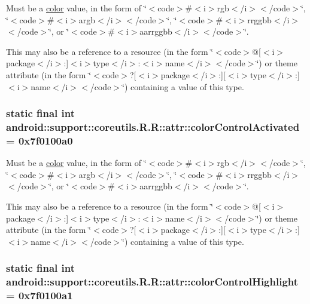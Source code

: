 Must be a \hyperlink{classandroid_1_1support_1_1coreutils_1_1_r_1_1color}{color} value, in the form of \char`\"{}$<$code$>$\#$<$i$>$rgb$<$/i$>$$<$/code$>$\char`\"{}, \char`\"{}$<$code$>$\#$<$i$>$argb$<$/i$>$$<$/code$>$\char`\"{}, \char`\"{}$<$code$>$\#$<$i$>$rrggbb$<$/i$>$$<$/code$>$\char`\"{}, or \char`\"{}$<$code$>$\#$<$i$>$aarrggbb$<$/i$>$$<$/code$>$\char`\"{}. 

This may also be a reference to a resource (in the form \char`\"{}$<$code$>$@\mbox{[}$<$i$>$package$<$/i$>$:\mbox{]}$<$i$>$type$<$/i$>$:$<$i$>$name$<$/i$>$$<$/code$>$\char`\"{}) or theme attribute (in the form \char`\"{}$<$code$>$?\mbox{[}$<$i$>$package$<$/i$>$:\mbox{]}\mbox{[}$<$i$>$type$<$/i$>$:\mbox{]}$<$i$>$name$<$/i$>$$<$/code$>$\char`\"{}) containing a value of this type. \hypertarget{classandroid_1_1support_1_1coreutils_1_1_r_1_1attr_bcbbcbd36b5f47a753a37968aec363d6}{
\subsubsection[{colorControlActivated}]{\setlength{\rightskip}{0pt plus 5cm}static final int android::support::coreutils.R.R::attr::colorControlActivated = 0x7f0100a0}}
\label{classandroid_1_1support_1_1coreutils_1_1_r_1_1attr_bcbbcbd36b5f47a753a37968aec363d6}


Must be a \hyperlink{classandroid_1_1support_1_1coreutils_1_1_r_1_1color}{color} value, in the form of \char`\"{}$<$code$>$\#$<$i$>$rgb$<$/i$>$$<$/code$>$\char`\"{}, \char`\"{}$<$code$>$\#$<$i$>$argb$<$/i$>$$<$/code$>$\char`\"{}, \char`\"{}$<$code$>$\#$<$i$>$rrggbb$<$/i$>$$<$/code$>$\char`\"{}, or \char`\"{}$<$code$>$\#$<$i$>$aarrggbb$<$/i$>$$<$/code$>$\char`\"{}. 

This may also be a reference to a resource (in the form \char`\"{}$<$code$>$@\mbox{[}$<$i$>$package$<$/i$>$:\mbox{]}$<$i$>$type$<$/i$>$:$<$i$>$name$<$/i$>$$<$/code$>$\char`\"{}) or theme attribute (in the form \char`\"{}$<$code$>$?\mbox{[}$<$i$>$package$<$/i$>$:\mbox{]}\mbox{[}$<$i$>$type$<$/i$>$:\mbox{]}$<$i$>$name$<$/i$>$$<$/code$>$\char`\"{}) containing a value of this type. \hypertarget{classandroid_1_1support_1_1coreutils_1_1_r_1_1attr_19ef81e42503602cb71899b90a1022a1}{
\subsubsection[{colorControlHighlight}]{\setlength{\rightskip}{0pt plus 5cm}static final int android::support::coreutils.R.R::attr::colorControlHighlight = 0x7f0100a1}}
\label{classandroid_1_1support_1_1coreutils_1_1_r_1_1attr_19ef81e42503602cb71899b90a1022a1}


